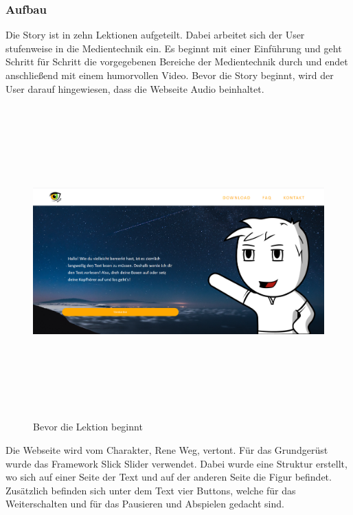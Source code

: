 \subsubsection{Aufbau}
Die Story ist in zehn Lektionen aufgeteilt. Dabei arbeitet sich der User stufenweise in die Medientechnik ein. Es beginnt mit einer Einführung und geht Schritt für Schritt die vorgegebenen Bereiche der Medientechnik durch und endet anschließend mit einem humorvollen Video. Bevor die Story beginnt, wird der User darauf hingewiesen, dass die Webseite Audio beinhaltet. 
\begin{figure}[ht]
	\centering				\includegraphics[width=12cm,height=12cm,keepaspectratio]{webseite_abb8} 
	\caption{Bevor die Lektion beginnt}
\end{figure} \leavevmode \newline
Die Webseite wird vom Charakter, Rene Weg, vertont. 
Für das Grundgerüst wurde das Framework Slick Slider verwendet. Dabei wurde eine Struktur erstellt, wo sich auf einer Seite der Text und auf der anderen Seite die Figur befindet. Zusätzlich befinden sich unter dem Text vier Buttons, welche für das Weiterschalten und für das Pausieren und Abspielen gedacht sind. \leavevmode \newpage
\lstset{
  frame=leftline,
  breaklines=true,
}
